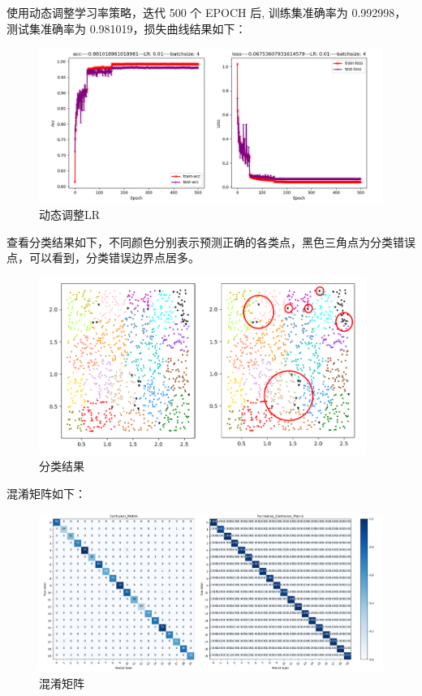 \documentclass[12pt]{article}
\begin{document}
	使用动态调整学习率策略，迭代 500 个 EPOCH 后, 训练集准确率为 0.992998，测试集准确率为 0.981019，损失曲线结果如下：
	
	\begin{figure}[H]
		\centering
		\includegraphics[width=4.5in]{./images/plane_normal_loss_step.png}
		\centering
		\caption{动态调整LR}
	\end{figure}

	查看分类结果如下，不同颜色分别表示预测正确的各类点，黑色三角点为分类错误点，可以看到，分类错误边界点居多。
	
	\begin{figure}[H]
		\centering
		\includegraphics[width=4.2in]{./images/plane_normal_result.png}
		\centering
		\caption{分类结果}
	\end{figure}

	混淆矩阵如下：
	
	\begin{figure}[H]
		\centering
		\includegraphics[width=4.6in]{./images/plane_normal_confusion.png}
		\centering
		\caption{混淆矩阵}
	\end{figure}
	
\end{document}
